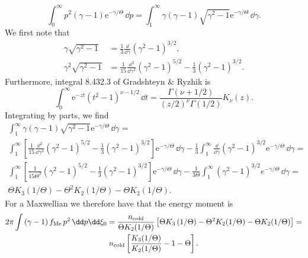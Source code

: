 \documentclass{notes}
\newcommand{\ee}{\mathrm{e}}
\newcommand{\fMe}{f_{\rm Me}}
\newcommand{\ncold}{n_{\rm cold}}
\begin{document}
    \begin{equation}
        \int_0^\infty p^2\left(\gamma-1\right) \ee^{-\gamma/\Theta}\,\dd p =
        \int_1^\infty \gamma\left(\gamma-1\right)\sqrt{\gamma^2-1}\ee^{-\gamma/\Theta}\,\dd\gamma.
    \end{equation}
    We first note that
    \begin{equation}
        \begin{aligned}
            \gamma\sqrt{\gamma^2-1} &= \frac{1}{3}\frac{\dd}{\dd\gamma}\left( \gamma^2 - 1\right)^{3/2},\\
            \gamma^2\sqrt{\gamma^2-1} &= \frac{1}{15}\frac{\dd^2}{\dd\gamma^2}\left( \gamma^2-1 \right)^{5/2}
            - \frac{1}{3}\left( \gamma^2-1 \right)^{3/2}.
        \end{aligned}
    \end{equation}
    Furthermore, integral 8.432.3 of Gradshteyn \& Ryzhik is
    \begin{equation}
        \int_0^\infty \ee^{-zt}\left( t^2-1 \right)^{\nu-1/2}\,\dd t =
        \frac{\Gamma\left(\nu+1/2\right)}{\left(z/2\right)^\nu\Gamma\left(1/2\right)} K_\nu(z).
    \end{equation}
    Integrating by parts, we find
    \begin{equation}
        \begin{gathered}
            \int_1^\infty \gamma\left(\gamma-1\right)\sqrt{\gamma^2-1}\ee^{-\gamma/\Theta}\,\dd\gamma =\\
            \int_1^\infty \left[
                \frac{1}{15}\frac{\dd^2}{\dd\gamma^2}\left( \gamma^2-1 \right)^{5/2}
                - \frac{1}{3}\left( \gamma^2-1 \right)^{3/2}
            \right] \ee^{-\gamma/\Theta}\,\dd\gamma - 
            \frac{1}{3}\int_1^\infty\frac{\dd}{\dd\gamma}\left( \gamma^2 - 1\right)^{3/2} \ee^{-\gamma/\Theta}\,\dd\gamma =\\
            \int_1^\infty\left[ \frac{1}{15\Theta^2}\left(\gamma^2-1\right)^{5/2} -
                \frac{1}{3}\left( \gamma^2 - 1\right)^{3/2} \right] \ee^{-\gamma/\Theta}\,\dd\gamma -
            \frac{1}{3\Theta}\int_1^\infty \left( \gamma^2 - 1\right)^{3/2} e^{-\gamma/\Theta}\,\dd\gamma =\\
            \Theta K_3(1/\Theta) - \Theta^2 K_2(1/\Theta) - \Theta K_2(1/\Theta).
        \end{gathered}
    \end{equation}
    For a Maxwellian we therefore have that the energy moment is
    \begin{equation}
        \begin{gathered}
            2\pi\int\left( \gamma-1 \right)\fMe\,p^2\,\dd p\dd\xi_0 =
            \frac{\ncold}{\Theta K_2(1/\Theta)} \left[
                \Theta K_3\left(1/\Theta\right) - \Theta^2 K_2(1/\Theta) - \Theta K_2(1/\Theta)
            \right] =\\
            \ncold\left[ \frac{K_3(1/\Theta)}{K_2(1/\Theta)} - 1 - \Theta \right].
        \end{gathered}
    \end{equation}
\end{document}
